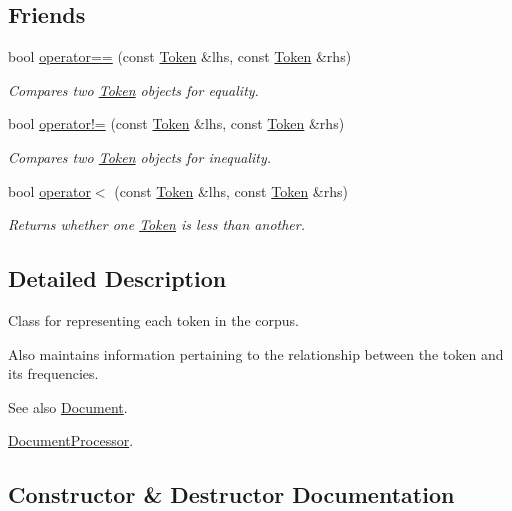 \subsection*{Friends}
\begin{DoxyCompactItemize}
\item 
bool \hyperlink{class_token_af48fd5b021b89a22f25aec6ae884f205}{operator==} (const \hyperlink{class_token}{Token} \&lhs, const \hyperlink{class_token}{Token} \&rhs)
\begin{DoxyCompactList}\small\item\em Compares two \hyperlink{class_token}{Token} objects for equality. \end{DoxyCompactList}\item 
bool \hyperlink{class_token_a720aad55f2d8469a52550be65d947562}{operator!=} (const \hyperlink{class_token}{Token} \&lhs, const \hyperlink{class_token}{Token} \&rhs)
\begin{DoxyCompactList}\small\item\em Compares two \hyperlink{class_token}{Token} objects for inequality. \end{DoxyCompactList}\item 
bool \hyperlink{class_token_a9b5081d21f0f5dda0c237d0e7622c271}{operator$<$} (const \hyperlink{class_token}{Token} \&lhs, const \hyperlink{class_token}{Token} \&rhs)
\begin{DoxyCompactList}\small\item\em Returns whether one \hyperlink{class_token}{Token} is less than another. \end{DoxyCompactList}\end{DoxyCompactItemize}


\subsection{Detailed Description}
Class for representing each token in the corpus. 

Also maintains information pertaining to the relationship between the token and its frequencies. \begin{DoxySeeAlso}{See also}
\hyperlink{class_document}{Document}. 

\hyperlink{class_document_processor}{Document\+Processor}. 
\end{DoxySeeAlso}


\subsection{Constructor \& Destructor Documentation}
\hypertarget{class_token_aa3c5868ba4115f3189df6b2ac5b36f39}{}
